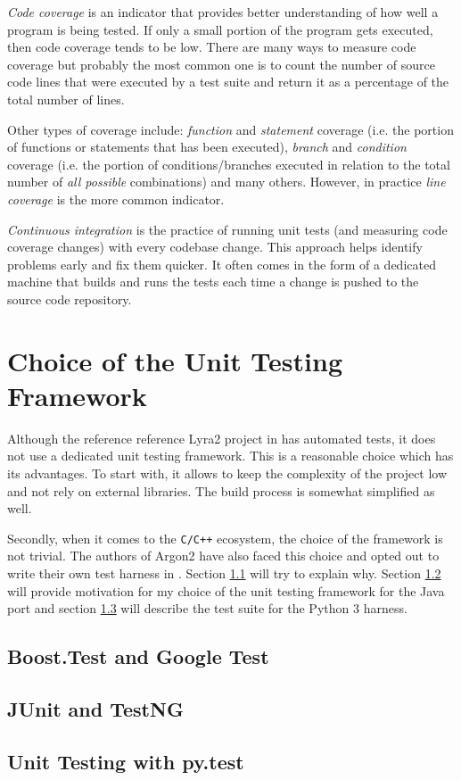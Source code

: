 \emph{Code coverage} is an indicator that provides better understanding of how well a program is being tested. If only a small portion of the program gets executed, then code coverage tends to be low. There are many ways to measure code coverage but probably the most common one is to count the number of source code lines that were executed by a test suite and return it as a percentage of the total number of lines.

Other types of coverage include: \emph{function} and \emph{statement} coverage (i.e. the portion of functions or statements that has been executed), \emph{branch} and \emph{condition} coverage (i.e. the portion of conditions/branches executed in relation to the total number of \emph{all possible} combinations) and many others. However, in practice \emph{line coverage} is the more common indicator.

\emph{Continuous integration} is the practice of running unit tests (and measuring code coverage changes) with every codebase change. This approach helps identify problems early and fix them quicker. It often comes in the form of a dedicated machine that builds and runs the tests each time a change is pushed to the source code repository.

\section{Choice of the Unit Testing Framework}

Although the reference reference Lyra2 project in \cite{github:2017:lyra} has automated tests, it does not use a dedicated unit testing framework. This is a reasonable choice which has its advantages. To start with, it allows to keep the complexity of the project low and not rely on external libraries. The build process is somewhat simplified as well.

Secondly, when it comes to the \texttt{C/C++} ecosystem, the choice of the framework is not trivial. The authors of Argon2 have also faced this choice and opted out to write their own test harness in \cite{github:2017:argon2-test.c}. Section \ref{sec:unit-boost-google} will try to explain why. Section \ref{sec:unit-junit-testng} will provide motivation for my choice of the unit testing framework for the Java port and section \ref{sec:unit-pytest} will describe the test suite for the Python 3 harness.

\subsection{Boost.Test and Google Test}
\label{sec:unit-boost-google}
\subsection{JUnit and TestNG}
\label{sec:unit-junit-testng}
\subsection{Unit Testing with py.test}
\label{sec:unit-pytest}
